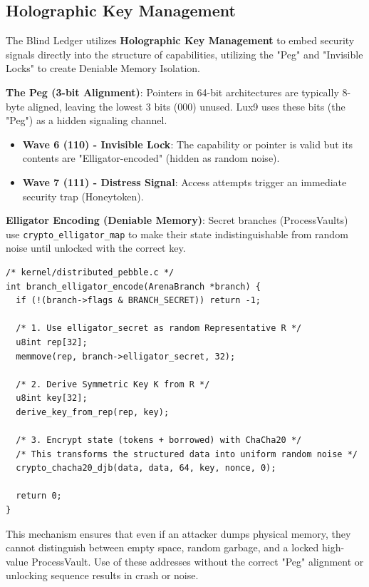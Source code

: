 \documentclass[11pt,letterpaper]{article}
\begin{document}
\subsection{Holographic Key Management}

The Blind Ledger utilizes \textbf{Holographic Key Management} to embed security signals directly into the structure of capabilities, utilizing the "Peg" and "Invisible Locks" to create Deniable Memory Isolation.

\textbf{The Peg (3-bit Alignment)}:
Pointers in 64-bit architectures are typically 8-byte aligned, leaving the lowest 3 bits (000) unused. Lux9 uses these bits (the "Peg") as a hidden signaling channel.

\begin{itemize}
\item \textbf{Wave 6 (110) - Invisible Lock}: The capability or pointer is valid but its contents are "Elligator-encoded" (hidden as random noise).
\item \textbf{Wave 7 (111) - Distress Signal}: Access attempts trigger an immediate security trap (Honeytoken).
\end{itemize}

\textbf{Elligator Encoding (Deniable Memory)}:
Secret branches (ProcessVaults) use \texttt{crypto_elligator_map} to make their state indistinguishable from random noise until unlocked with the correct key.

\begin{lstlisting}
/* kernel/distributed_pebble.c */
int branch_elligator_encode(ArenaBranch *branch) {
  if (!(branch->flags & BRANCH_SECRET)) return -1;

  /* 1. Use elligator_secret as random Representative R */
  u8int rep[32];
  memmove(rep, branch->elligator_secret, 32);

  /* 2. Derive Symmetric Key K from R */
  u8int key[32];
  derive_key_from_rep(rep, key);

  /* 3. Encrypt state (tokens + borrowed) with ChaCha20 */
  /* This transforms the structured data into uniform random noise */
  crypto_chacha20_djb(data, data, 64, key, nonce, 0);

  return 0;
}
\end{lstlisting}

This mechanism ensures that even if an attacker dumps physical memory, they cannot distinguish between empty space, random garbage, and a locked high-value ProcessVault. Use of these addresses without the correct "Peg" alignment or unlocking sequence results in crash or noise.
\end{document}
